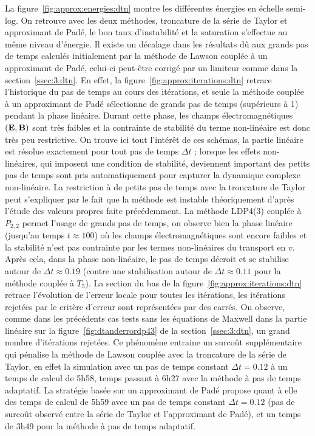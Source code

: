 La figure~\ref{fig:approx:energies:dtn} montre les différentes énergies en échelle semi-log. On retrouve avec les deux méthodes, troncature de la série de Taylor et approximant de Padé, le bon taux d'instabilité et la saturation s'effectue au même niveau d'énergie. Il existe un décalage dans les résultats dû aux grands pas de temps calculés initialement par la méthode de Lawson couplée à un approximant de Padé, celui-ci peut-être corrigé par un limiteur comme dans la section~\ref{ssec:3:dtn}. En effet, la figure~\ref{fig:approx:iterations:dtn} retrace l'historique du pas de temps au cours des itérations, et seule la méthode couplée à un approximant de Padé sélectionne de grands pas de temps (supérieurs à 1) pendant la phase linéaire. Durant cette phase, les champs électromagnétiques $(\vb{E},\vb{B})$ sont très faibles et la contrainte de stabilité du terme non-linéaire est donc très peu restrictive. On trouve ici tout l'intérêt de ces schémas, la partie linéaire est résolue exactement pour tout pas de temps $\Delta t$ ; lorsque les effets non-linéaires, qui imposent une condition de stabilité, deviennent important des petits pas de temps sont pris automatiquement pour capturer la dynamique complexe non-linéaire. La restriction à de petits pas de temps avec la troncature de Taylor peut s'expliquer par le fait que la méthode est instable théoriquement d'après l'étude des valeurs propres faite précédemment. La méthode LDP4(3) couplée à $P_{2,2}$ permet l'usage de grands pas de temps, on observe bien la phase linéaire (jusqu'au temps $t\approx 100$) où les champs électromagnétiques sont encore faibles et la stabilité n'est pas contrainte par les termes non-linéaires du transport en $v$. Après cela, dans la phase non-linéaire, le pas de temps décroit et se stabilise autour de $\Delta t\approx 0.19$ (contre une stabilisation autour de $\Delta t\approx 0.11$ pour la méthode couplée à $T_5$). La section du bas de la figure~\ref{fig:approx:iterations:dtn} retrace l'évolution de l'erreur locale pour toutes les itérations, les itérations rejetées par le critère d'erreur sont représentées par des carrés. On observe, comme dans les précédents cas tests sans les équations de Maxwell dans la partie linéaire sur la figure~\ref{fig:dtanderrordp43} de la section~\ref{ssec:3:dtn}, un grand nombre d'itérations rejetées. Ce phénomène entraine un surcoût supplémentaire qui pénalise la méthode de Lawson couplée avec la troncature de la série de Taylor, en effet la simulation avec un pas de temps constant $\Delta t=0.12$ à un temps de calcul de 5h58, temps passant à 6h27 avec la méthode à pas de temps adaptatif. La stratégie basée sur un approximant de Padé propose quant à elle des temps de calcul de 5h59 avec un pas de temps constant $\Delta t=0.12$ (pas de surcoût observé entre la série de Taylor et l'approximant de Padé), et un temps de 3h49 pour la méthode à pas de temps adaptatif.

